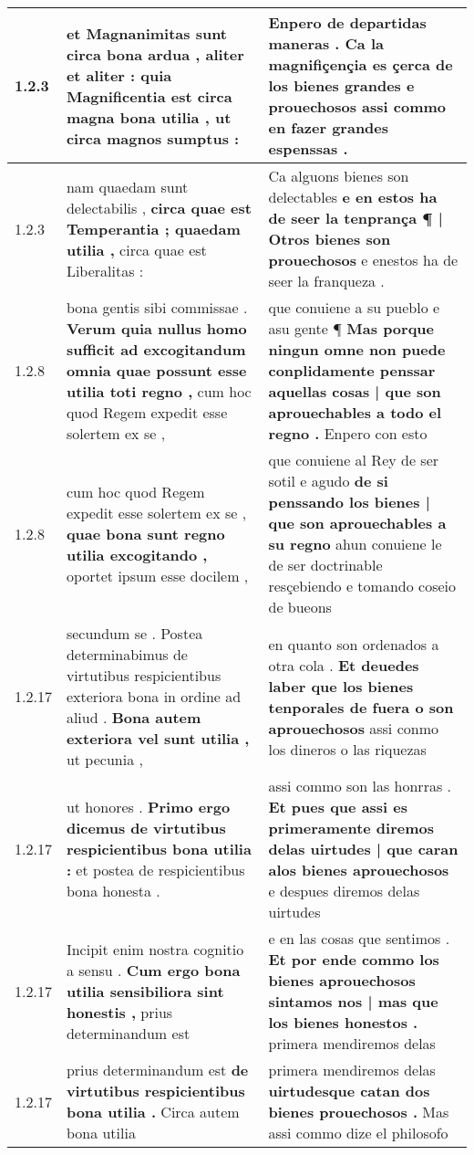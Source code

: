 \begin{tabular}{|p{1cm}|p{6.5cm}|p{6.5cm}|}
1.2.3 & et Magnanimitas sunt circa bona ardua , aliter et aliter : \textbf{ quia Magnificentia est circa magna bona utilia , } ut circa magnos sumptus : & Enpero de departidas maneras . \textbf{ Ca la magnifiçençia es çerca de los bienes grandes e prouechosos } assi commo en fazer grandes espenssas . \\\hline
1.2.3 & nam quaedam sunt delectabilis , \textbf{ circa quae est Temperantia ; quaedam utilia , } circa quae est Liberalitas : & Ca alguons bienes son delectables \textbf{ e en estos ha de seer la tenprança ¶ | Otros bienes son prouechosos } e enestos ha de seer la franqueza . \\\hline
1.2.8 & bona gentis sibi commissae . \textbf{ Verum quia nullus homo sufficit ad excogitandum omnia quae possunt esse utilia toti regno , } cum hoc quod Regem expedit esse solertem ex se , & que conuiene a su pueblo e asu gente ¶ \textbf{ Mas porque ningun omne non puede conplidamente penssar aquellas cosas | que son aprouechables a todo el regno . } Enpero con esto \\\hline
1.2.8 & cum hoc quod Regem expedit esse solertem ex se , \textbf{ quae bona sunt regno utilia excogitando , } oportet ipsum esse docilem , & que conuiene al Rey de ser sotil e agudo \textbf{ de si penssando los bienes | que son aprouechables a su regno } ahun conuiene le de ser doctrinable resçebiendo e tomando coseio de bueons \\\hline
1.2.17 & secundum se . Postea determinabimus de virtutibus respicientibus exteriora bona in ordine ad aliud . \textbf{ Bona autem exteriora vel sunt utilia , } ut pecunia , & en quanto son ordenados a otra cola . \textbf{ Et deuedes laber que los bienes tenporales de fuera o son aprouechosos } assi conmo los dineros o las riquezas \\\hline
1.2.17 & ut honores . \textbf{ Primo ergo dicemus de virtutibus respicientibus bona utilia : } et postea de respicientibus bona honesta . & assi commo son las honrras . \textbf{ Et pues que assi es primeramente diremos delas uirtudes | que caran alos bienes aprouechosos } e despues diremos delas uirtudes \\\hline
1.2.17 & Incipit enim nostra cognitio a sensu . \textbf{ Cum ergo bona utilia sensibiliora sint honestis , } prius determinandum est & e en las cosas que sentimos . \textbf{ Et por ende commo los bienes aprouechosos sintamos nos | mas que los bienes honestos . } primera mendiremos delas \\\hline
1.2.17 & prius determinandum est \textbf{ de virtutibus respicientibus bona utilia . } Circa autem bona utilia & primera mendiremos delas \textbf{ uirtudesque catan dos bienes prouechosos . } Mas assi commo dize el philosofo \\\hline

\end{tabular}
